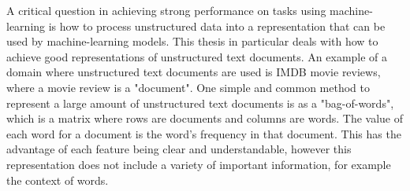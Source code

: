 A critical question in achieving strong performance on tasks using machine-learning is how to process  unstructured data into a representation that can be used by machine-learning models. This thesis in particular deals with how to achieve good representations of unstructured text documents. An example of a domain where unstructured text documents are used is IMDB movie reviews, where a movie review is a "document". One simple and common method to represent a large amount of unstructured text documents is as a "bag-of-words", which is a matrix where rows are documents and columns are words. The value of each word for a document is the word's frequency in that document. This has the advantage of each feature being clear and understandable, however this representation does not include  a variety of important information, for example the context of words. %





